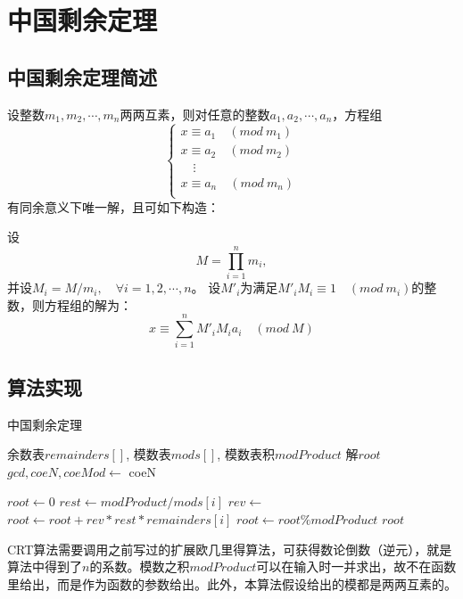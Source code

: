 \documentclass[11pt]{ctexart}
\begin{document}
\newpage{}
\section{中国剩余定理}
\subsection{中国剩余定理简述}
设整数$m_1, m_2, \cdots, m_n$两两互素，则对任意的整数$a_1, a_2, \cdots, a_n$，方程组
\begin{equation}
\left\{
     \begin{array}{lr}
     x\equiv a_1\quad (mod\  m_1)    \\
     x\equiv a_2\quad (mod\  m_2)    \\
     \quad \vdots \\
     x\equiv a_n\quad (mod\  m_n)    \\  
     \end{array}
\right.
\end{equation}
有同余意义下唯一解，且可如下构造：

设$$M = \prod_{i=1}^{n}{m_i},$$并设$M_i = M / m_i, \quad \forall i = 1,2,\cdots, n$。
设$M'_i$为满足$M'_iM_i \equiv 1 \quad (mod \  m_i)$的整数，则方程组的解为：
$$x\equiv \sum^{n}_{i = 1} M'_iM_ia_i \quad (mod\  M)$$
\subsection{算法实现}

\begin{algorithm}  
    \caption{中国剩余定理}  
    \begin{algorithmic}[1] %
        \Require 余数表$remainders[]$, 模数表$mods[]$, 模数表积$modProduct$  
        \Ensure 解$root$  
            \State $gcd, coeN, coeMod \gets $
            \State \Return coeN
        \EndFunction

            \State $root \gets 0$
                \State $rest \gets modProduct / mods[i]$
                \State $rev \gets $
                \State $root \gets root + rev * rest * remainders[i]$
                \State $root \gets root \% modProduct$
            \EndFor
            \State \Return $root$
        \EndFunction  
    \end{algorithmic}  
\end{algorithm} 
CRT算法需要调用之前写过的扩展欧几里得算法，可获得数论倒数（逆元），就是算法中得到了$n$的系数。模数之积$modProduct$可以在输入时一并求出，故不在函数里给出，而是作为函数的参数给出。此外，本算法假设给出的模都是两两互素的。
\end{document}
